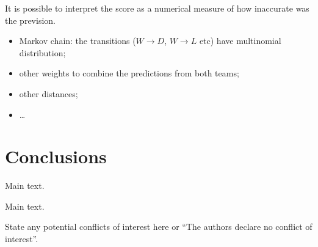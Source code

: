 \documentclass[journal,article,accept,moreauthors,pdftex,12pt,a4paper]{mdpi}
\begin{document}

It is possible to interpret the score as a numerical measure of how inaccurate was the 
prevision. 

\begin{itemize}

\item Markov chain: the transitions ($W\to D$, $W \to L$ etc) have multinomial distribution;

\item other weights to combine the predictions from both teams;

\item other distances;

\item \dots  
\end{itemize}



\section{Conclusions}




Main text.



Main text.



State any potential conflicts of interest here or ``The authors declare no conflict of interest''. 


\makeatletter
\renewcommand\@biblabel[1]{#1. }
\makeatother
\end{document}
